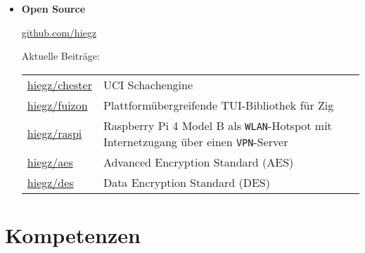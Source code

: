 \documentclass[]{article}
\begin{document}
\begin{itemize}[leftmargin=0.15in, rightmargin=0.15in, label={}]
    \item {\large\bfseries Open Source}

        \:\: { \href{https://github.com/hiegz}{\ttfamily \underline{github.com/hiegz}}}

        \vspace{7pt}
        \hspace{5pt}
        Aktuelle Beiträge:

        \hspace{20pt}
        \begin{tabular}{@{}lp{8cm}}
            \href{https://github.com/hiegz/chester}{\ttfamily hiegz/chester} & UCI Schachengine \\[3pt]
            \href{https://github.com/hiegz/fuizon}{\ttfamily hiegz/fuizon}   & Plattformübergreifende TUI-Bibliothek für Zig \\[3pt]
            \href{https://github.com/hiegz/raspi}{\ttfamily hiegz/raspi}     & Raspberry Pi 4 Model B als \verb|WLAN|-Hotspot mit Internetzugang über einen \verb|VPN|-Server \\[3pt]
            \href{https://github.com/hiegz/aes}{\ttfamily hiegz/aes}         & Advanced Encryption Standard (AES) \\[3pt]
            \href{https://github.com/hiegz/des}{\ttfamily hiegz/des}         & Data Encryption Standard (DES)
        \end{tabular}
\end{itemize}

\section{Kompetenzen}
\end{document}
